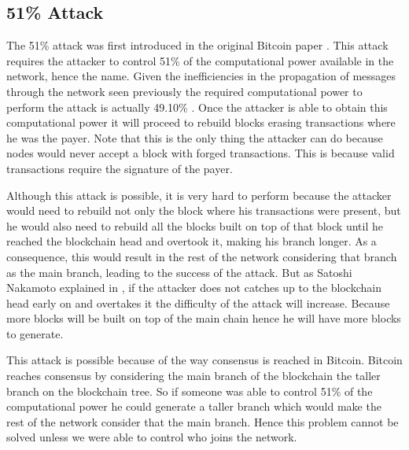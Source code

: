 \subsection{51\% Attack}
\label{sec:51attack}
The 51\% attack was first introduced in the original Bitcoin paper \cite{nakamoto2008bitcoin}. This attack requires the attacker to control 51\% of the computational power available in the network, hence the name. Given the inefficiencies in the propagation of messages through the network seen previously the required computational power to perform the attack is actually 49.10\% \cite{decker2013information}. Once the attacker is able to obtain this computational power it will proceed to rebuild blocks erasing transactions where he was the payer. Note that this is the only thing the attacker can do because nodes would never accept a block with forged transactions. This is because valid transactions require the signature of the payer.

Although this attack is possible, it is very hard to perform because the attacker would need to rebuild not only the block where his transactions were present, but he would also need to rebuild all the blocks built on top of that block until he reached the blockchain head and overtook it, making his branch longer. As a consequence, this would result in the rest of the network considering that branch as the main branch, leading to the success of the attack. But as Satoshi Nakamoto explained in \cite{nakamoto2008bitcoin}, if the attacker does not catches up to the blockchain head early on and overtakes it the difficulty of the attack will increase. Because more blocks will be built on top of the main chain hence he will have more blocks to generate.


This attack is possible because of the way consensus is reached in Bitcoin. Bitcoin reaches consensus by considering the main branch of the blockchain the taller branch on the blockchain tree. So if someone was able to control 51\% of the computational power he could generate a taller branch which would make the rest of the network consider that the main branch. Hence this problem cannot be solved unless we were able to control who joins the network.

